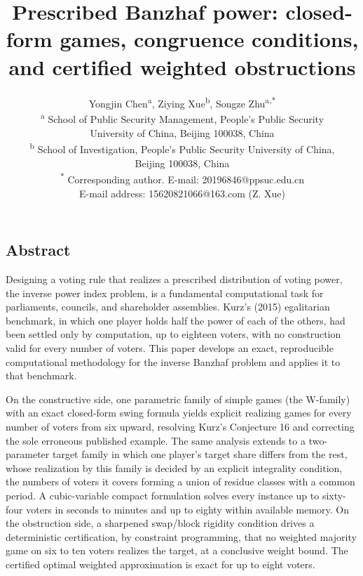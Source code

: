 \documentclass[
]{article}
\author{}
\date{}
\begin{document}
\title{Prescribed Banzhaf power: closed-form games, congruence conditions, and certified weighted obstructions}
\author{Yongjin Chen\textsuperscript{a}, Ziying Xue\textsuperscript{b}, Songze Zhu\textsuperscript{a,*}\\[4pt]
{\footnotesize \textsuperscript{a} School of Public Security Management, People's Public Security}\\[1pt]
{\footnotesize University of China, Beijing 100038, China}\\[1pt]
{\footnotesize \textsuperscript{b} School of Investigation, People's Public Security University of China,}\\[1pt]
{\footnotesize Beijing 100038, China}\\[2pt]
{\footnotesize \textsuperscript{*} Corresponding author. E-mail: 20196846@ppsuc.edu.cn}\\[1pt]
{\footnotesize E-mail address: 15620821066@163.com (Z. Xue)}}
\date{}
\maketitle

\subsection{Abstract}\label{abstract}

Designing a voting rule that realizes a prescribed distribution of
voting power, the inverse power index problem, is a fundamental
computational task for parliaments, councils, and shareholder
assemblies. Kurz's (2015) egalitarian benchmark, in which one player
holds half the power of each of the others, had been settled only by
computation, up to eighteen voters, with no construction valid for every
number of voters. This paper develops an exact, reproducible
computational methodology for the inverse Banzhaf problem and applies it
to that benchmark.

On the constructive side, one parametric family of simple games (the
W-family) with an exact closed-form swing formula yields explicit
realizing games for every number of voters from six upward, resolving
Kurz's Conjecture 16 and correcting the sole erroneous published
example. The same analysis extends to a two-parameter target family in
which one player's target share differs from the rest, whose realization
by this family is decided by an explicit integrality condition, the
numbers of voters it covers forming a union of residue classes with a
common period. A cubic-variable compact formulation solves every
instance up to sixty-four voters in seconds to minutes and up to eighty
within available memory. On the obstruction side, a sharpened swap/block
rigidity condition drives a deterministic certification, by constraint
programming, that no weighted majority game on six to ten voters
realizes the target, at a conclusive weight bound. The certified optimal
weighted approximation is exact for up to eight voters.
\end{document}
